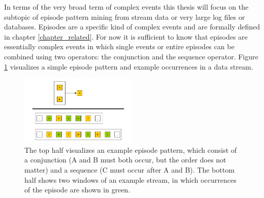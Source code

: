 In terms of the very broad term of complex events this thesis will focus on the subtopic of episode pattern mining from stream data or very large log files or databases. Episodes are a specific kind of complex events and are formally defined in chapter \ref{chapter_related}. For now it is sufficient to know that episodes are essentially complex events in which single events or entire episodes can be combined using two operators: the conjunction and the sequence operator. Figure \ref{fig_simpleEpisodeExample} visualizes a simple episode pattern and example occurrences in a data stream.

\begin{figure}[h]
	\centering
  	\includegraphics[width=0.5\textwidth]{exampleEpisode.jpg}
	\caption{The top half visualizes an example episode pattern, which consist of a conjunction (A and B must both occur, but the order does not matter) and a sequence (C must occur after A and B). The bottom half shows two windows of an example stream, in which occurrences of the episode are shown in green.}
	\label{fig_simpleEpisodeExample}
\end{figure}

